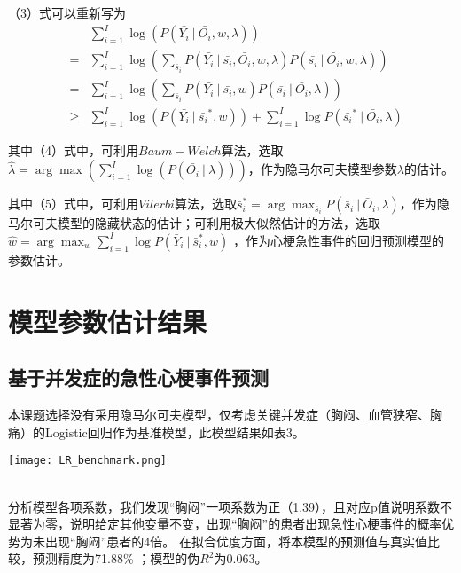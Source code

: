 \documentclass{article}
\newcommand{\nb}{\nonumber}
\begin{document}
（3）式可以重新写为
\begin{eqnarray}
&&\sum\limits_{i=1}^{I} \log(P(\bar{Y_{i}}~|~\bar{O_{i}},w,\lambda))\nb\\
&=&\sum\limits_{i=1}^{I}\log(\sum\limits_{\bar{s}_i}P(\bar{Y_{i}}~|~\bar{s_i},\bar{O_{i}},w,\lambda)P(\bar{s_i}~|~\bar{O_{i}},w,\lambda))\nb\\
&=&\sum\limits_{i=1}^{I}\log(\sum\limits_{\bar{s}_i}P(\bar{Y_{i}}~|~\bar{s_i},w)P(\bar{s_i}~|~\bar{O_{i}},\lambda))\nb\\
&\geq&\sum\limits_{i=1}^{I}\log(P(\bar{Y_{i}}~|~\bar{s_i}^*,w))+\sum\limits_{i=1}^{I}\log P(\bar{s_i}^*~|~\bar{O_{i}},\lambda)
\end{eqnarray}

其中（4）式中，可利用$Baum-Welch$算法，选取$\hat{\lambda}=\arg\max(\sum\limits_{i=1}^{I}\log(P(\bar{O_{i}}~|~\lambda)))$，作为隐马尔可夫模型参数$\lambda$的估计。

其中（5）式中，可利用$Vilerbi$算法，选取$\bar s_i^*=\arg\max_{\bar s_i} P(\bar{s}_i~|~\bar{O}_i,\lambda)$，作为隐马尔可夫模型的隐藏状态的估计；可利用极大似然估计的方法，选取  $\hat{w}=\arg\max_{w} \sum\limits_{i=1}^{I} \log P(\bar{Y}_i~|~\bar{s}_i^*,w)$ ，作为心梗急性事件的回归预测模型的参数估计。


\section{模型参数估计结果}
\subsection{基于并发症的急性心梗事件预测}
本课题选择没有采用隐马尔可夫模型，仅考虑关键并发症（胸闷、血管狭窄、胸痛）的Logistic回归作为基准模型，此模型结果如表3。
\begin{center}
\texttt{[image: LR\_benchmark.png]}\\
\\
\end{center}
分析模型各项系数，我们发现“胸闷”一项系数为正（1.39），且对应p值说明系数不显著为零，说明给定其他变量不变，出现“胸闷”的患者出现急性心梗事件的概率优势为未出现“胸闷”患者的4倍。
在拟合优度方面，将本模型的预测值与真实值比较，预测精度为71.88\% ；模型的伪$R^2$为0.063。
\end{document}

